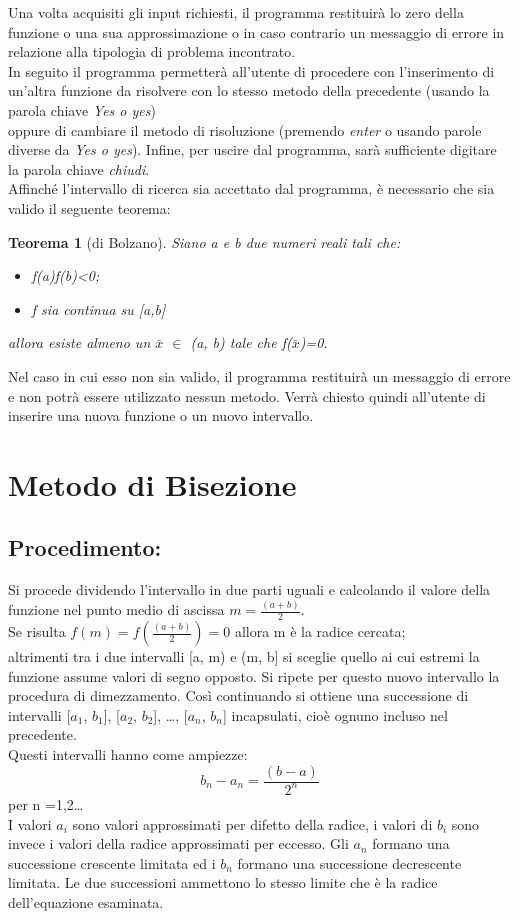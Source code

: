 \documentclass[a4paper,12pt,]{article}
\begin{document}
Una volta acquisiti gli input richiesti, il programma restituirà lo zero della funzione o una sua approssimazione o
in caso contrario un messaggio di errore in relazione alla tipologia di problema incontrato.\\
In seguito il programma  permetterà all'utente di procedere con l'inserimento di un'altra funzione da risolvere con lo stesso metodo della precedente (usando la parola chiave \emph {Yes o yes}) \\
oppure di cambiare il metodo di risoluzione (premendo \emph {enter} o usando parole diverse da  \emph{Yes o yes}).
Infine, per uscire dal programma, sarà sufficiente digitare la parola chiave \emph{chiudi}.\\
Affinché l'intervallo di ricerca sia accettato dal programma, è necessario che sia valido il seguente teorema:

\newtheorem{Teorema}{Teorema}
\begin{Teorema}[di Bolzano]
Siano a e b due numeri reali tali che:
\begin{itemize}
\item  f(a)f(b)<0;
\item  f sia continua su [a,b]
\end{itemize}	
allora esiste almeno un $\bar{x}$ $\in$  (a, b) tale che f($\bar{x}$)=0.
\end{Teorema}
Nel caso in cui esso non sia valido, il programma restituirà un messaggio di errore e non potrà essere utilizzato nessun metodo.
Verrà chiesto quindi all'utente di inserire una nuova funzione o un nuovo intervallo.

\section{Metodo di Bisezione}
\subsection{Procedimento:}
Si procede dividendo l'intervallo in due parti uguali e calcolando il valore della funzione nel punto medio di ascissa   $m = \frac{(a+b)}{2}$.
\\
Se risulta  $f(m) =f (\frac{(a+b)}{2}) = 0$   allora m è la radice cercata; 
\\
altrimenti tra i due intervalli [a, m) e (m, b] si sceglie quello ai cui estremi la funzione  assume  valori di segno opposto. 
Si ripete per questo  nuovo intervallo la procedura di dimezzamento.
Così continuando si ottiene una successione di intervalli [$a_1$, $b_1$], [$a_2$, $b_2$], \dots, [$a_n$, $b_n$] incapsulati,
cioè ognuno incluso nel precedente. 
\\
Questi intervalli hanno come ampiezze:
\begin{equation} b_n- a_n=\frac{(b-a)}{2^n}  \end {equation}per n =1,2\dots
\\
I valori $a_i$ sono valori approssimati per difetto della radice, i valori di $b_i$ sono invece i valori della radice approssimati per eccesso. 
Gli $a_n$ formano una successione crescente limitata ed i $b_n$ formano una successione decrescente limitata.
Le due successioni ammettono lo stesso limite che è la radice dell'equazione esaminata.
\end{document}
